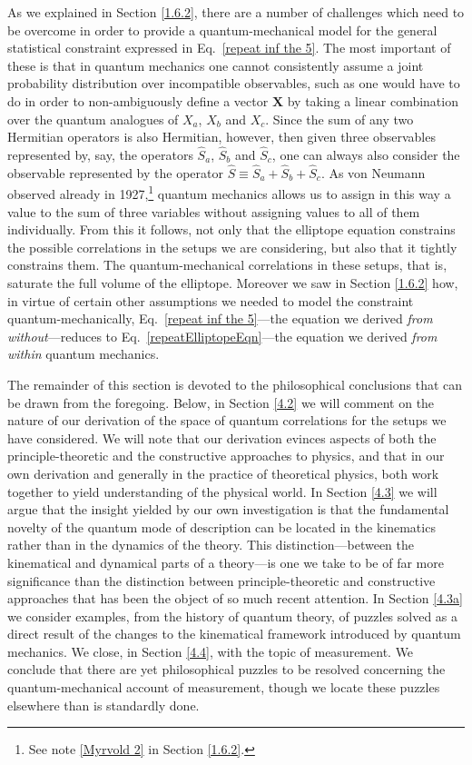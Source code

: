 As we explained in Section \ref{1.6.2}, there are a number of challenges which need to be overcome in order to provide a quantum-mechanical model for the general statistical constraint expressed in Eq.\ \eqref{repeat inf the 5}. The most important of these is that in quantum mechanics one cannot consistently assume a joint probability distribution over incompatible observables, such as one would have to do in order to non-ambiguously define a vector $\mathbf{X}$ by taking a linear combination over the quantum analogues of $X_a$, $X_b$ and $X_c$. Since the sum of any two Hermitian operators is also Hermitian, however, then given three observables represented by, say, the operators $\hat{S}_a$, $\hat{S}_b$ and $\hat{S}_c$, one can always also consider the observable represented by the operator $\hat{S} \equiv \hat{S}_a + \hat{S}_b + \hat{S}_c$. As von Neumann observed already in 1927,\footnote{See note \ref{Myrvold 2} in Section \ref{1.6.2}.} quantum mechanics allows us to assign in this way a value to the sum of three variables without assigning values to all of them individually. From this it follows, not only that the elliptope equation constrains the possible correlations in the setups we are considering, but also that it tightly constrains them. The quantum-mechanical correlations in these setups, that is, saturate the full volume of the elliptope. Moreover we saw in Section \ref{1.6.2} how, in virtue of certain other assumptions we needed to model the constraint quantum-mechanically, Eq.\ \eqref{repeat inf the 5}---the equation we derived \emph{from without}---reduces to Eq.\ \eqref{repeatElliptopeEqn}---the equation we derived \emph{from within} quantum mechanics.

The remainder of this section is devoted to the philosophical conclusions that can be drawn from the foregoing. Below, in Section \ref{4.2} we will comment on the nature of our derivation of the space of quantum correlations for the setups we have considered. We will note that our derivation evinces aspects of both the principle-theoretic and the constructive approaches to physics, and that in our own derivation and generally in the practice of theoretical physics, both work together to yield understanding of the physical world. In Section \ref{4.3} we will argue that the insight yielded by our own investigation is that the fundamental novelty of the quantum mode of description can be located in the kinematics rather than in the dynamics of the theory. This distinction---between the kinematical and dynamical parts of a theory---is one we take to be of far more significance than the distinction between principle-theoretic and constructive approaches that has been the object of so much recent attention. In Section \ref{4.3a} we consider examples, from the history of quantum theory, of puzzles solved as a direct result of the changes to the kinematical framework introduced by quantum mechanics. We close, in Section \ref{4.4}, with the topic of measurement. We conclude that there are yet philosophical puzzles to be resolved concerning the quantum-mechanical account of measurement, though we locate these puzzles elsewhere than is standardly done.

